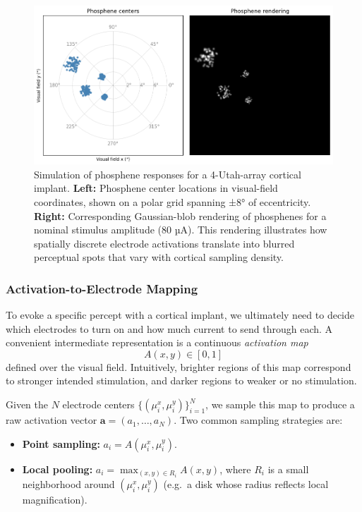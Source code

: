 \begin{figure}[h]
  \centering
  \includegraphics[width=0.9\columnwidth]{figures/phosphenerendering4utaharrays.png}
  \caption{Simulation of phosphene responses for a 4-Utah-array cortical implant. \textbf{Left:} Phosphene center locations in visual-field coordinates, shown on a polar grid spanning ±8° of eccentricity. \textbf{Right:} Corresponding Gaussian-blob rendering of phosphenes for a nominal stimulus amplitude (80 µA). This rendering illustrates how spatially discrete electrode activations translate into blurred perceptual spots that vary with cortical sampling density.}
  \label{fig:phosphene-rendering}
\end{figure}


\subsubsection{Activation-to-Electrode Mapping}

To evoke a specific percept with a cortical implant, we ultimately need to decide which electrodes to turn on and how much current to send through each.  A convenient intermediate representation is a continuous \emph{activation map} 
\[
  A(x,y)\in[0,1]
\]
defined over the visual field.  Intuitively, brighter regions of this map correspond to stronger intended stimulation, and darker regions to weaker or no stimulation.  

Given the $N$ electrode centers \(\{(\mu_i^x,\mu_i^y)\}_{i=1}^N\), we sample this map to produce a raw activation vector \(\mathbf{a}=(a_1,\dots,a_N)\).  Two common sampling strategies are:

\begin{itemize}
  \item \textbf{Point sampling:}  
    \(\displaystyle a_i = A(\mu_i^x,\mu_i^y)\).
  \item \textbf{Local pooling:}  
    \(\displaystyle a_i = \max_{(x,y)\in R_i} A(x,y)\), where \(R_i\) is a small neighborhood around \((\mu_i^x,\mu_i^y)\) (e.g.\ a disk whose radius reflects local magnification).
\end{itemize}

